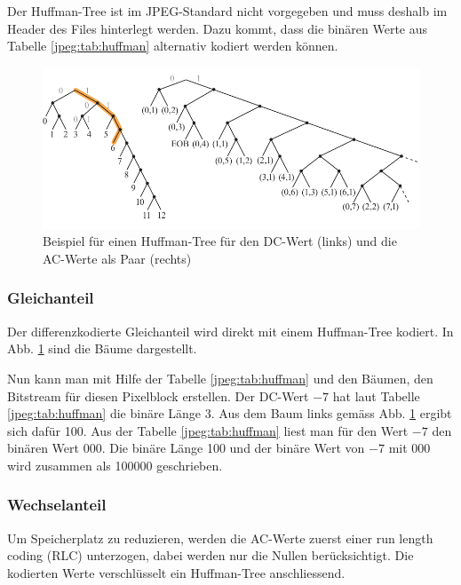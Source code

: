 Der Huffman-Tree ist im JPEG-Standard nicht vorgegeben und muss deshalb im Header des Files hinterlegt werden.
Dazu kommt, dass die binären Werte aus Tabelle \ref{jpeg:tab:huffman} alternativ kodiert werden können.

\begin{figure}[t]
    \centering
    \includegraphics[width=\textwidth]{papers/jpeg/pictures/huffman.pdf}
    \caption{Beispiel für einen Huffman-Tree für den DC-Wert (links) \cite{jpeg:dccomponentyoutube} und die AC-Werte als Paar (rechts) \cite{jpeg:accomponentsyoutube}
        \label{jpeg:fig:huffman}}
\end{figure}

\subsubsection{Gleichanteil
\label{jpeg:subsubsection:gleichanteil}}
Der differenzkodierte Gleichanteil wird direkt mit einem Huffman-Tree kodiert.
In Abb. \ref{jpeg:fig:huffman} sind die Bäume dargestellt.

Nun kann man mit Hilfe der Tabelle \ref{jpeg:tab:huffman} und den Bäumen, den Bitstream für diesen Pixelblock erstellen.
Der DC-Wert \(-7\) hat laut Tabelle \ref{jpeg:tab:huffman} die binäre Länge 3.
Aus dem Baum links gemäss Abb. \ref{jpeg:fig:huffman} ergibt sich dafür 100.
Aus der Tabelle \ref{jpeg:tab:huffman} liest man für den Wert \(-7\) den binären Wert 000.
Die binäre Länge 100 und der binäre Wert von \(-7\) mit 000 wird zusammen als 100000 geschrieben.

\subsubsection{Wechselanteil
\label{jpeg:subsubsection:wechselanteil}}
Um Speicherplatz zu reduzieren, werden die AC-Werte zuerst einer run length coding (RLC) unterzogen, dabei werden nur die Nullen berücksichtigt. 
Die kodierten Werte verschlüsselt ein Huffman-Tree anschliessend.

